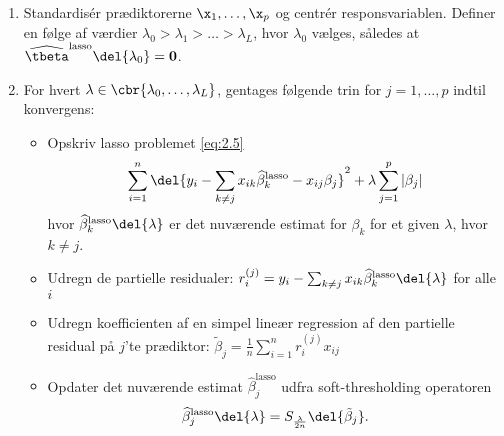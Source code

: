 %
\begin{alg} 
\begin{enumerate}
\item Standardisér prædiktorerne \(\x_1, \ldots, \x_p\) og centrér responsvariablen.
Definer en følge af værdier \(\lambda_0 > \lambda_1 > \ldots > \lambda_L\), hvor \(\lambda_0\) vælges, således at \(\widehat{\tbeta}^\text{lasso} \del{\lambda_0} =\mathbf{0}\).
\item For hvert \(\lambda \in \cbr{\lambda_0, \ldots, \lambda_L}\), gentages følgende trin for \(j = 1, \ldots, p\) indtil konvergens:
\begin{itemize}
\item Opskriv lasso problemet \eqref{eq:2.5}
\begin{align*}
\sum_{i=1}^n \del{y_i - \sum_{k \neq j} x_{ik} \widehat{\beta}^\text{lasso}_k - x_{ij} \beta_j}^2 + \lambda \sum_{j = 1}^p \vert \beta_j \vert
\end{align*}
hvor \(\widehat{\beta}^\text{lasso}_k \del{\lambda}\) er det nuværende estimat for \(\beta_k\) for et given \(\lambda\), hvor \(k \neq j\).
\item Udregn de partielle residualer: \(r_{i}^{(j)} = y_i - \sum_{k \neq j} x_{ik} \widehat{\beta}^\text{lasso}_k \del{\lambda}\) for alle \(i\)
\item Udregn koefficienten af en simpel lineær regression af den partielle residual på \(j\)'te prædiktor: \(\tilde{\beta}_j = \frac{1}{n} \sum_{i=1}^n r_{i}^{(j)} x_{ij}\) 
\item Opdater det nuværende estimat \(\widehat{\beta}^\text{lasso}_j\) udfra soft-thresholding operatoren
\begin{align}
\widehat{\beta}^\text{lasso}_j \del{\lambda}= S_{\frac{\lambda}{2n}} \del{\tilde{\beta}_j}. \label{eq:update_coordinate}
\end{align}
\end{itemize}
\end{enumerate}
\end{alg}
